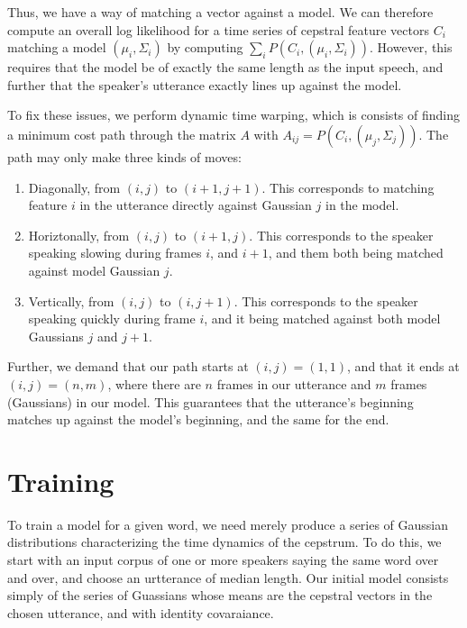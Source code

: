 \documentclass{article}
\begin{document}
Thus, we have a way of matching a vector against a model.
We can therefore compute an overall log likelihood for a time series of cepstral feature vectors $C_i$ matching a model $(\mu_i, \Sigma_i)$ by computing $\sum_i P(C_i, (\mu_i, \Sigma_i))$.
However, this requires that the model be of exactly the same length as the input speech, and further that the speaker's utterance exactly lines up against the model.

To fix these issues, we perform dynamic time warping, which is consists of finding a minimum cost path through the matrix $A$ with $A_{ij} = P(C_i, (\mu_j, \Sigma_j))$.
The path may only make three kinds of moves:
\begin{enumerate}
\item Diagonally, from $(i, j)$ to $(i+1, j+1)$.
This corresponds to matching feature $i$ in the utterance directly against Gaussian $j$ in the model.
\item Horiztonally, from $(i, j)$ to $(i+1, j)$.
This corresponds to the speaker speaking slowing during frames $i$, and $i+1$, and them both being matched against model Gaussian $j$.
\item Vertically, from $(i, j)$ to $(i, j+1)$.
This corresponds to the speaker speaking quickly during frame $i$, and it being matched against both model Gaussians $j$ and $j+1$.
\end{enumerate}
Further, we demand that our path starts at $(i, j) = (1, 1)$, and that it ends at $(i, j) = (n, m)$, where there are $n$ frames in our utterance and $m$ frames (Gaussians) in our model.
This guarantees that the utterance's beginning matches up against the model's beginning, and the same for the end.

\section{Training}
To train a model for a given word, we need merely produce a series of Gaussian distributions characterizing the time dynamics of the cepstrum.
To do this, we start with an input corpus of one or more speakers saying the same word over and over, and choose an urtterance of median length.
Our initial model consists simply of the series of Guassians whose means are the cepstral vectors in the chosen utterance, and with identity covaraiance.
\end{document}

